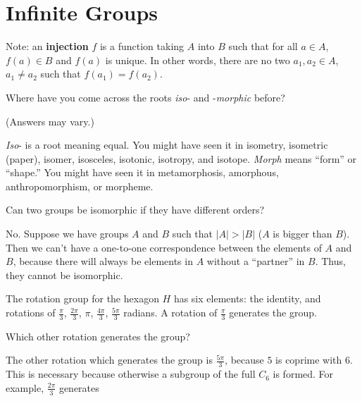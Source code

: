 \documentclass[../gatm_answers.tex]{subfiles}
\begin{document}
\section{Infinite Groups}

Note: an \textbf{injection} $f$ is a function taking $A$ into $B$ such that for all $a\in A$, $f(a)\in B$ and $f(a)$ is unique. In other words, there are no two $a_1,a_2\in A$, $a_1\neq a_2$ such that $f(a_1)=f(a_2)$.

\begin{outer_problem}[start=1]
\item Where have you come across the roots \textit{iso}- and -\textit{morphic} before?
\end{outer_problem}

(Answers may vary.)

\textit{Iso}- is a root meaning equal. You might have seen it in isometry, isometric (paper), isomer, isosceles, isotonic, isotropy, and isotope. \textit{Morph} means ``form'' or ``shape.'' You might have seen it in metamorphosis, amorphous, anthropomorphism, or morpheme.

\begin{outer_problem}
\item Can two groups be isomorphic if they have different orders?
\end{outer_problem}

No. Suppose we have groups $A$ and $B$ such that $|A|>|B|$ ($A$ is bigger than $B$). Then we can't have a one-to-one correspondence between the elements of $A$ and $B$, because there will always be elements in $A$ without a ``partner'' in $B$. Thus, they cannot be isomorphic.

\begin{outer_problem}
\item The rotation group for the hexagon $H$ has six elements: the identity, and rotations of $\frac{\pi}{3}$, $\frac{2\pi}{3}$, $\pi$, $\frac{4\pi}{3}$, $\frac{5\pi}{3}$ radians. A rotation of $\frac{\pi}{3}$ generates the group.
\end{outer_problem}

\begin{inner_problem}[start=1]
\item Which other rotation generates the group?
\end{inner_problem}

The other rotation which generates the group is $\frac{5\pi}{3}$, because $5$ is coprime with $6$. This is necessary because otherwise a subgroup of the full $C_6$ is formed. For example, $\frac{2\pi}{3}$ generates 
\end{document}
